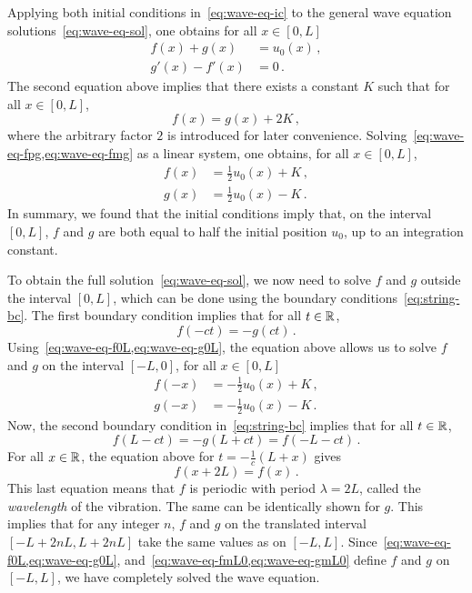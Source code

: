 Applying both initial conditions in~\cref{eq:wave-eq-ic} to the general wave equation
solutions~\cref{eq:wave-eq-sol}, one obtains for all $x\in[0,L]$
\begin{align}
	f(x)+g(x)   & =u_0(x)\label{eq:wave-eq-fpg}\,, \\
	g'(x)-f'(x) & =0\,.
\end{align}
The second equation above implies that there exists a constant $K$ such that for all
$x\in[0,L]$,
\begin{equation}
	f(x)=g(x)+2K\,,\label{eq:wave-eq-fmg}
\end{equation}
where the arbitrary factor $2$ is introduced for later convenience.
Solving~\cref{eq:wave-eq-fpg,eq:wave-eq-fmg} as a linear system, one obtains, for all
$x\in[0,L]$,
\begin{align}
	f(x) & =\frac{1}{2}u_0(x)+K\,,\label{eq:wave-eq-f0L} \\
	g(x) & =\frac{1}{2}u_0(x)-K\,.\label{eq:wave-eq-g0L}
\end{align}
In summary, we found that the initial conditions imply that, on the interval $[0,L]$, $f$
and $g$ are both equal to half the initial position $u_0$, up to an integration constant.

To obtain the full solution~\cref{eq:wave-eq-sol}, we now need to solve $f$ and $g$
outside the interval $[0,L]$, which can be done using the boundary
conditions~\cref{eq:string-bc}. The first boundary condition implies that for all
$t\in\mathbb{R}$,
\begin{equation}
	f(-ct)=-g(ct)\,.
\end{equation}
Using~\cref{eq:wave-eq-f0L,eq:wave-eq-g0L}, the equation above allows us to solve $f$ and
$g$ on the interval $[-L,0]$, \ie for all $x\in[0,L]$
\begin{align}
	f(-x) & =-\frac{1}{2}u_0(x)+K\,,\label{eq:wave-eq-fmL0} \\
	g(-x) & =-\frac{1}{2}u_0(x)-K\,.\label{eq:wave-eq-gmL0}
\end{align}
Now, the second boundary condition in~\cref{eq:string-bc} implies that for all
$t\in\mathbb{R}$,
\begin{equation}
	f(L-ct)=-g(L+ct)=f(-L-ct)\,.
\end{equation}
For all $x\in\mathbb{R}$, the equation above for $t=-\frac{1}{c}(L+x)$ gives
\begin{equation}
	f(x+2L)=f(x)\,.
\end{equation}
This last equation means that $f$ is periodic with period $\lambda=2L$, called the
\emph{wavelength} of the vibration. The same can be identically shown for $g$. This
implies that for any integer $n$, $f$ and $g$ on the translated interval $[-L+2nL,L+2nL]$
take the same values as on $[-L,L]$. Since~\cref{eq:wave-eq-f0L,eq:wave-eq-g0L},
and~\cref{eq:wave-eq-fmL0,eq:wave-eq-gmL0} define $f$ and $g$ on $[-L,L]$, we have
completely solved the wave equation.

